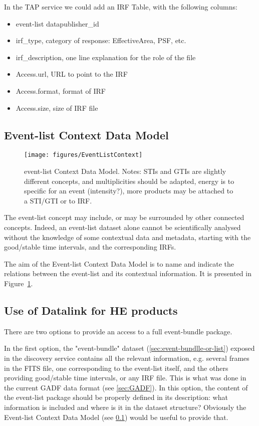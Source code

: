 \documentclass[11pt,a4paper]{ivoa}
\begin{document}
In the TAP service we could add an IRF Table, with the following columns:

\begin{itemize}
    \item event-list datapublisher\_id
    \item irf\_type, category of response: EffectiveArea, PSF, etc.
    \item irf\_description, one line explanation for the role of the file
    \item Access.url, URL to point to the IRF
    \item Access.format, format of IRF
    \item Access.size, size of IRF file
\end{itemize}



\subsection{Event-list Context Data Model}
\label{sec:EventListContext}

\begin{figure}
\centering
\texttt{[image: figures/EventListContext]}
\caption{event-list Context Data Model. Notes: STIs and GTIs are slightly different concepts, and multiplicities should be adapted, energy is to specific for an event (intensity?), more products may be attached to a STI/GTI or to IRF.}
\label{fig:EventListContext}
\end{figure}

The event-list concept may include, or may be surrounded by other connected concepts. Indeed, an event-list dataset alone cannot be scientifically analysed without the knowledge of some contextual data and metadata, starting with the good/stable time intervals, and the corresponding IRFs.

The aim of the Event-list Context Data Model is to name and indicate the relations between the event-list and its contextual information. It is presented in Figure~\ref{fig:EventListContext}.


\subsection{Use of Datalink for HE products}
\label{sec:datalink}
There are two options to provide an access to a full event-bundle package.

In the first option, the "event-bundle" dataset (\ref{sec:event-bundlle-or-list}) exposed in the discovery service  contains all the relevant information, e.g. several frames in the FITS file, one corresponding to the event-list itself, and the others providing good/stable time intervals, or any IRF file. This is what was done in the current GADF data format (see \ref{sec:GADF}). In this option, the content of the event-list package should be properly defined in its description: what information is included and where is it in the dataset structure? Obviously the Event-list Context Data Model (see \ref{sec:EventListContext}) would be useful to provide that.
\end{document}
